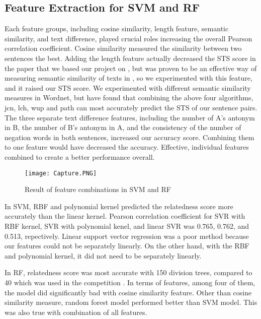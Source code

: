 \documentclass{article} %
\begin{document}
     	\subsection{Feature Extraction for SVM and RF}
Each feature groups, including cosine similarity, length feature, semantic similarity, and text difference, played crucial roles increasing the overall Pearson correlation coefficient. Cosine similarity measured the similarity between two sentences the best. Adding the length feature actually decreased the STS score in the paper that we based our project on \cite{ecnu}, but was proven to be an effective way of measuring semantic similarity of texts in \cite{corley}, so we experimented with this feature, and it raised our STS score. We experimented with different semantic similarity measures in Wordnet, but have found that combining the above four algorithms, jcn, lch, wup and path can most accurately predict the STS of our sentence pairs. The three separate text difference features, including the number of A's antonym in B, the number of B's antonym in A, and the consistency of the number of negation words in both sentences, increased our accuracy score. Combining them to one feature would have decreased the accuracy. Effective, individual features combined to create a better performance overall.

\begin{figure}[h]
\begin{center}
\texttt{[image: Capture.PNG]}
\end{center}
\caption{Result of feature combinations in SVM and RF}
\end{figure}

In SVM, RBF and polynomial kernel predicted the relatedness score more accurately than the linear kernel. Pearson correlation coefficient for SVR with RBF kernel, SVR with polynomial kenel, and linear SVR was 0.765, 0.762, and 0.513, repectively. Linear support vector regression was a poor method because our features could not be separately linearly. On the other hand, with the RBF and polynomial kernel, it did not need to be separately linearly.  

In RF, relatedness score was most accurate with 150 division trees, compared to 40 which was used in the \cite{ecnu} competition . In terms of features, among four of them, the model did significantly bad with cosine similarity feature. Other than cosine similarity measure, random forest model performed better than SVM model. This was also true with combination of all features.
\end{document}
